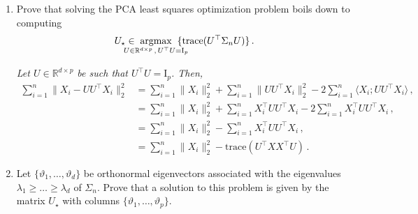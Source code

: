\documentclass[a4paper,10pt,fleqn]{article}
\newcommand{\eqsp}{\,}
\newcommand{\rset}{\ensuremath{\mathbb{R}}}
\newcommand{\1}{\ensuremath{\mathbbm{1}}}
\newcommand{\bfU}{U}
\newcommand{\bfX}{X}
\newcommand{\bfs}{\Sigma}
\newcommand{\bfA}{A}
\newcommand{\bfV}{V}
\newcommand{\bfI}{\mathrm{I}}
\newcommand{\bfD}{D}
\begin{document}
\begin{enumerate}
\item Prove that solving the PCA least squares optimization problem boils down to computing
$$
\bfU_{\star} \in \hspace{-0.5cm}\underset{\bfU\in \rset^{d\times p}\eqsp,\eqsp \bfU^\top\bfU = \bfI_p}{\mathrm{argmax}} \hspace{-.4cm}\{ \mathrm{trace}(\bfU^\top\bfs_n\bfU)\}\eqsp.
$$

\vspace{.2cm}

{\em
Let $\bfU\in\rset^{d\times p}$ be such that $\bfU^\top\bfU = \bfI_p$. Then,
\begin{align*}
\sum_{i=1}^n\|X_i - \bfU\bfU^\top X_i\|_2^2 &= \sum_{i=1}^n\|X_i\|_2^2 + \sum_{i=1}^n\|\bfU\bfU^\top X_i\|_2^2 - 2\sum_{i=1}^n\langle X_i;\bfU\bfU^\top X_i\rangle\eqsp,\\
&=  \sum_{i=1}^n\|X_i\|_2^2 + \sum_{i=1}^nX^\top_i\bfU\bfU^\top X_i - 2\sum_{i=1}^nX^\top_i\bfU\bfU^\top X_i\eqsp,\\
&=  \sum_{i=1}^n\|X_i\|_2^2 - \sum_{i=1}^nX^\top_i\bfU\bfU^\top X_i\eqsp,\\
&=  \sum_{i=1}^n\|X_i\|_2^2 - \mathrm{trace}(\bfU^\top\bfX\bfX^\top\bfU)\eqsp.
\end{align*}
}
\item Let $\{\vartheta_1,\ldots,\vartheta_d\}$ be orthonormal eigenvectors associated with the eigenvalues $\lambda_1\geqslant \ldots \geqslant \lambda_d$ of $\bfs_n$. Prove that a solution to this problem is given by the matrix $\bfU_{\star}$ with columns $\{\vartheta_1,\ldots,\vartheta_p\}$.

\vspace{.2cm}


\end{enumerate}
\end{document}
